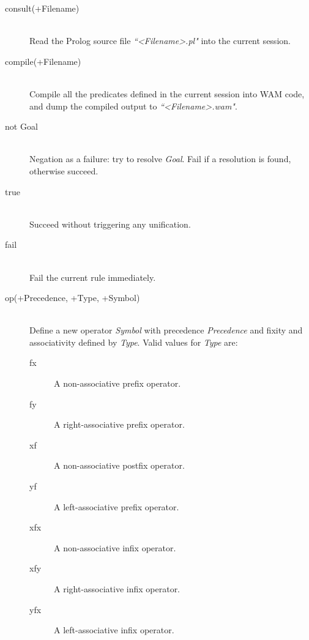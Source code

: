 \documentclass[11pt]{report}
\begin{document}
\begin{description}

\item [consult(+Filename)]  \hfill \\
Read the Prolog source file \emph{``\textless{}Filename\textgreater{}.pl"} into the current session.

\item [compile(+Filename)]  \hfill \\
Compile all the predicates defined in the current session into WAM code, and dump the compiled output to \emph{``\textless{}Filename\textgreater{}.wam"}.

\item [not Goal]  \hfill \\
Negation as a failure: try to resolve \emph{Goal}. Fail if a resolution is found, otherwise succeed.

\item [true]  \hfill \\
Succeed without triggering any unification.

\item [fail]  \hfill \\
Fail the current rule immediately.

\item [op(+Precedence, +Type, +Symbol)]  \hfill \\
Define a new operator \emph{Symbol} with precedence \emph{Precedence} and fixity and associativity defined by \emph{Type}. Valid values for \emph{Type} are:

\begin{description}
\item [fx]  A non-associative prefix operator.
\item [fy]  A right-associative prefix operator.
\item [xf]  A non-associative postfix operator.
\item [yf]  A left-associative prefix operator.
\item [xfx]  A non-associative infix operator.
\item [xfy]  A right-associative infix operator.
\item [yfx]  A left-associative infix operator.
\end{description}

\end{description}
\end{document}
